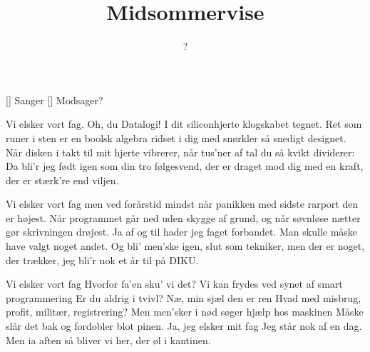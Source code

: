 \documentclass[a4paper,11pt]{article}
\title{Midsommervise}
\author{?}
\begin{document}
\maketitle

\begin{roles}
[] Sanger
[] Modsager?
\end{roles}

\begin{song}
Vi elsker vort fag.
Oh, du Datalogi!
I dit siliconhjerte klogskabet tegnet.
Ret som runer i sten
er en boolsk algebra
ridset i dig med snørkler så snedigt designet.
Når disken i takt til mit hjerte vibrerer,
når tus'ner af tal du så kvikt dividerer:
Da  bli'r jeg født igen
som din tro følgesvend,
der er draget mod dig med en kraft, der er stærk're end viljen.

Vi elsker vort fag
men ved forårstid mindst
når panikken med sidste rarport den er højest.
Når programmet går ned
uden skygge af grund,
og når søvnløse nætter gør skrivningen drøjest.
Ja af og til hader jeg faget forbandet.
Man skulle måske have valgt noget andet.
Og bli' men'ske igen,
slut som tekniker, men
der er noget, der trækker, jeg bli'r nok et år til på DIKU.

Vi elsker vort fag
 Hvorfor fa'en sku' vi det?
 Vi kan frydes ved synet af smart programmering
 Er du aldrig i tvivl?
 Næ, min sjæl den er ren
 Hvad med misbrug, profit, militær, registrering?
 Men men'sker i nød søger hjælp hos maskinen
 Måske slår det bak og fordobler blot pinen.
 Ja, jeg elsker mit fag
 Jeg står nok af en dag.
 Men ia aften så bliver vi her, der øl i kantinen.
\end{song}
\end{document}
